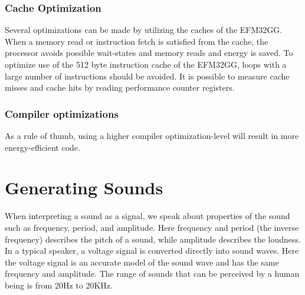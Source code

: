 \subsubsection{Cache Optimization}
Several optimizations can be made by utilizing the caches of the EFM32GG. When a memory read or instruction fetch is satisfied from the cache, the processor avoids possible wait-states and memory reads and energy is saved. To optimize use of the 512 byte instruction cache of the EFM32GG, loops with a large number of instructions should be avoided. It is possible to measure cache misses and cache hits by reading performance counter registers.\cite{efm32-energy-optimization}


\subsubsection{Compiler optimizations}
As a rule of thumb, using a higher compiler optimization-level will result in more energy-efficient code.


%



\section{Generating Sounds}
When interpreting a sound as a signal, we speak about properties of the sound such as frequency, period, and amplitude. Here frequency and period (the inverse frequency) describes the pitch of a sound, while amplitude describes the loudness. In a typical speaker, a voltage signal is converted directly into sound waves. Here the voltage signal is an accurate model of the sound wave and has the same frequency and amplitude. The range of sounds that can be perceived by a human being is from 20Hz to 20KHz.\cite{compendium}
